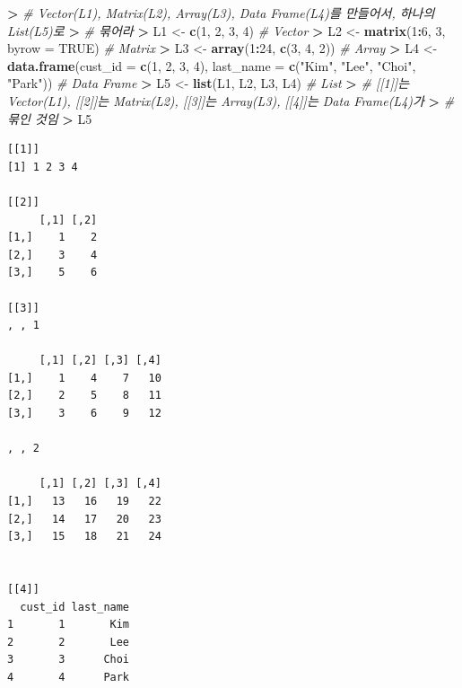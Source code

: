 \documentclass[11pt,a4paper]{book}
\newenvironment{Shaded}{\begin{snugshade}}{\end{snugshade}}
\newcommand{\KeywordTok}[1]{\textcolor[rgb]{0.13,0.29,0.53}{\textbf{#1}}}
\newcommand{\DataTypeTok}[1]{\textcolor[rgb]{0.13,0.29,0.53}{#1}}
\newcommand{\DecValTok}[1]{\textcolor[rgb]{0.00,0.00,0.81}{#1}}
\newcommand{\StringTok}[1]{\textcolor[rgb]{0.31,0.60,0.02}{#1}}
\newcommand{\CommentTok}[1]{\textcolor[rgb]{0.56,0.35,0.01}{\textit{#1}}}
\newcommand{\OtherTok}[1]{\textcolor[rgb]{0.56,0.35,0.01}{#1}}
\newcommand{\OperatorTok}[1]{\textcolor[rgb]{0.81,0.36,0.00}{\textbf{#1}}}
\newcommand{\ErrorTok}[1]{\textcolor[rgb]{0.64,0.00,0.00}{\textbf{#1}}}
\newcommand{\NormalTok}[1]{#1}
\theoremstyle{definition}
\theoremstyle{definition}
\theoremstyle{definition}
\theoremstyle{remark}
\begin{document}
\begin{Shaded}
\begin{Highlighting}[]
\OperatorTok{>}\StringTok{ }\CommentTok{# Vector(L1), Matrix(L2), Array(L3), Data Frame(L4)를 만들어서, 하나의 List(L5)로}
\ErrorTok{>}\StringTok{ }\CommentTok{# 묶어라}
\ErrorTok{>}\StringTok{ }\NormalTok{L1 <-}\StringTok{ }\KeywordTok{c}\NormalTok{(}\DecValTok{1}\NormalTok{, }\DecValTok{2}\NormalTok{, }\DecValTok{3}\NormalTok{, }\DecValTok{4}\NormalTok{)  }\CommentTok{# Vector}
\OperatorTok{>}\StringTok{ }\NormalTok{L2 <-}\StringTok{ }\KeywordTok{matrix}\NormalTok{(}\DecValTok{1}\OperatorTok{:}\DecValTok{6}\NormalTok{, }\DecValTok{3}\NormalTok{, }\DataTypeTok{byrow =} \OtherTok{TRUE}\NormalTok{)  }\CommentTok{# Matrix}
\OperatorTok{>}\StringTok{ }\NormalTok{L3 <-}\StringTok{ }\KeywordTok{array}\NormalTok{(}\DecValTok{1}\OperatorTok{:}\DecValTok{24}\NormalTok{, }\KeywordTok{c}\NormalTok{(}\DecValTok{3}\NormalTok{, }\DecValTok{4}\NormalTok{, }\DecValTok{2}\NormalTok{))  }\CommentTok{# Array}
\OperatorTok{>}\StringTok{ }\NormalTok{L4 <-}\StringTok{ }\KeywordTok{data.frame}\NormalTok{(}\DataTypeTok{cust_id =} \KeywordTok{c}\NormalTok{(}\DecValTok{1}\NormalTok{, }\DecValTok{2}\NormalTok{, }\DecValTok{3}\NormalTok{, }\DecValTok{4}\NormalTok{), }\DataTypeTok{last_name =} \KeywordTok{c}\NormalTok{(}\StringTok{"Kim"}\NormalTok{, }\StringTok{"Lee"}\NormalTok{, }\StringTok{"Choi"}\NormalTok{, }\StringTok{"Park"}\NormalTok{))  }\CommentTok{# Data Frame}
\OperatorTok{>}\StringTok{ }\NormalTok{L5 <-}\StringTok{ }\KeywordTok{list}\NormalTok{(L1, L2, L3, L4)  }\CommentTok{# List}
\OperatorTok{>}\StringTok{ }\CommentTok{# [[1]]는 Vector(L1), [[2]]는 Matrix(L2), [[3]]는 Array(L3), [[4]]는 Data Frame(L4)가}
\ErrorTok{>}\StringTok{ }\CommentTok{# 묶인 것임}
\ErrorTok{>}\StringTok{ }\NormalTok{L5}
\end{Highlighting}
\end{Shaded}

\begin{verbatim}
[[1]]
[1] 1 2 3 4

[[2]]
     [,1] [,2]
[1,]    1    2
[2,]    3    4
[3,]    5    6

[[3]]
, , 1

     [,1] [,2] [,3] [,4]
[1,]    1    4    7   10
[2,]    2    5    8   11
[3,]    3    6    9   12

, , 2

     [,1] [,2] [,3] [,4]
[1,]   13   16   19   22
[2,]   14   17   20   23
[3,]   15   18   21   24


[[4]]
  cust_id last_name
1       1       Kim
2       2       Lee
3       3      Choi
4       4      Park
\end{verbatim}
\end{document}
